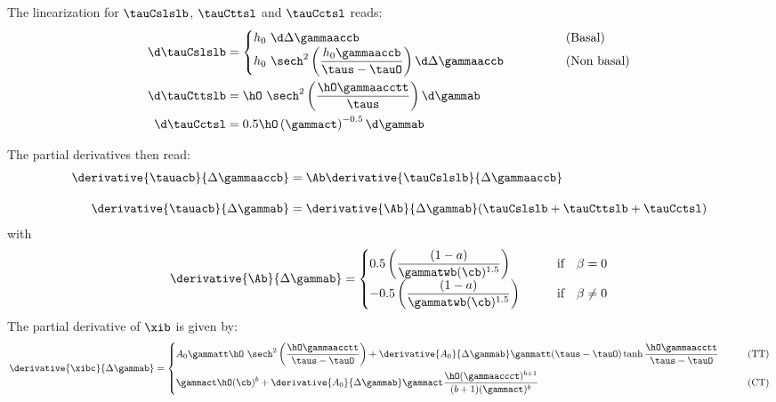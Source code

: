   The linearization for $\tauCslslb$, $\tauCttsl$ and $\tauCctsl$ reads: 
  \begin{align}
          \d\tauCslslb &= 
          \begin{cases}  \displaystyle h_0 \ \d\Delta\gammaaccb & \qquad \qquad \text{(Basal)} 
            \\ \displaystyle h_0 \ \sech^2\left(\frac{h_0 \gammaaccb}{\taus - \tauO}\right) \d\Delta\gammaaccb & \qquad \qquad \text{(Non basal)}
          \end{cases}\\
          \d\tauCttslb &= \hO \ \sech^2\left(\frac{\hO\gammaacctt}{\taus}\right) \d\gammab \\
          \d\tauCctsl &= 0.5 \hO \left(\gammact\right)^{-0.5} \d\gammab
  \end{align}
  
  The partial derivatives then read:
  \begin{align}
    \derivative{\tauacb}{\Delta\gammaaccb} & = \Ab \derivative{\tauCslslb}{\Delta\gammaaccb} \\[10pt]
    \derivative{\tauacb}{\Delta\gammab} & = \derivative{\Ab}{\Delta\gammab} (\tauCslslb + \tauCttslb + \tauCctsl)
  \end{align}
  with
  \begin{equation}
    \derivative{\Ab}{\Delta\gammab} = 
    \begin{cases}
      \displaystyle 0.5 \left( \frac{(1-a)}{\gammatwb(\cb)^{1.5}} \right) & \qquad \text{if} \quad \beta = 0  \\
      \displaystyle - 0.5 \left( \frac{(1-a)}{\gammatwb(\cb)^{1.5}} \right) & \qquad \text{if} \quad \beta \neq 0  
    \end{cases}
  \end{equation}
  The partial derivative of $\xib$ is given by:
  \begin{equation}
    \derivative{\xibc}{\Delta\gammab} = 
    \begin{cases}
      \displaystyle A_0 \gammatt \hO \ \sech^2\left(\frac{\hO \gammaacctt}{\taus-\tauO}\right) + \derivative{A_0}{\Delta\gammab}  \gammatt (\taus-\tauO) \tanh{\frac{\hO \gammaacctt}{\taus-\tauO}} & \qquad \text{(TT)} \\[10pt]
      \displaystyle \gammact \hO (\cb)^{b} + \derivative{A_0}{\Delta\gammab} \gammact \frac{\hO (\gammaaccct)^{b+1}}{(b+1){(\gammact})^b} & \qquad \text{(CT)} 
    \end{cases}
  \end{equation}
  
